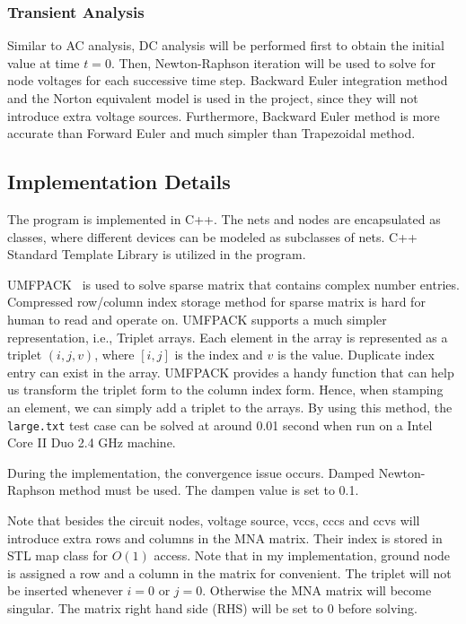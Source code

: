 \documentclass[12pt]{article}
\begin{document}
\subsubsection{Transient Analysis}
Similar to AC analysis, DC analysis will be performed first to obtain 
the initial value at time $t=0$.
Then, Newton-Raphson iteration will be used to solve for node voltages
for each successive time step. 
Backward Euler integration method and the Norton equivalent model 
is used in the project, since they will not introduce extra voltage sources.
Furthermore, Backward Euler method is more accurate than Forward Euler 
and much simpler than Trapezoidal method.

\subsection{Implementation Details}
The program is implemented in C++. The nets and nodes are encapsulated as classes,
where different devices can be modeled as subclasses of nets.
C++ Standard Template Library is utilized in the program.

UMFPACK~\cite{umfpack} is used 
to solve sparse matrix that contains complex number entries.
Compressed row/column index storage method for sparse matrix is hard for human to read and
operate on.  UMFPACK supports a much simpler representation, i.e.,
Triplet arrays. Each element in the array is represented as a triplet $(i,j,v)$, 
where $[i,j]$ is the index and $v$ is the value.
Duplicate index entry can exist in the array. UMFPACK provides a 
handy function that can help us transform the triplet form to the column index form.
Hence, when stamping an element, we can simply add a triplet to the arrays.
By using this method, the \texttt{large.txt} test case can be solved 
at around 0.01 second when run on a Intel Core II Duo 2.4 GHz machine.

During the implementation, the convergence issue occurs.
Damped Newton-Raphson method must be used. The dampen value is set to 0.1.

Note that besides the circuit nodes, voltage source, vccs, cccs and ccvs 
will introduce extra rows and columns in the MNA matrix.
Their index is stored in STL map class for $O(1)$ access.
Note that in my implementation, ground node is assigned a row and a column 
in the matrix for convenient. The triplet will not be inserted whenever 
$i=0$ or $j=0$.  Otherwise the MNA matrix will become singular.
The matrix right hand side (RHS) will be set to 0 before solving.
\end{document}
